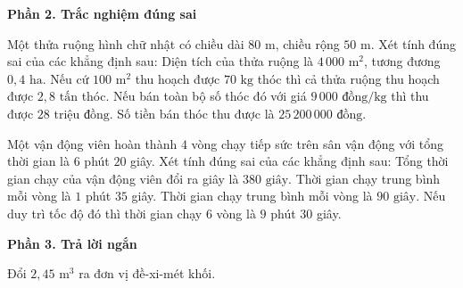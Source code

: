 \textbf{Phần 2. Trắc nghiệm đúng sai}

\begin{ex} %
Một thửa ruộng hình chữ nhật có chiều dài $80\text{ m}$, chiều rộng $50\text{ m}$. Xét tính đúng sai của các khẳng định sau:
\choiceTF
{\True Diện tích của thửa ruộng là $4\,000\text{ m}^2$, tương đương $0{,}4\text{ ha}$.}
{\True Nếu cứ $100\text{ m}^2$ thu hoạch được $70\text{ kg}$ thóc thì cả thửa ruộng thu hoạch được $2{,}8\text{ tấn}$ thóc.}
{Nếu bán toàn bộ số thóc đó với giá $9\,000\text{ đồng/kg}$ thì thu được $28\text{ triệu đồng}$.}
{\True Số tiền bán thóc thu được là $25\,200\,000\text{ đồng}$.}
\end{ex}

\begin{ex} %
Một vận động viên hoàn thành $4$ vòng chạy tiếp sức trên sân vận động với tổng thời gian là $6$ phút $20$ giây. Xét tính đúng sai của các khẳng định sau:
\choiceTF
{\True Tổng thời gian chạy của vận động viên đổi ra giây là $380\text{ giây}$.}
{\True Thời gian chạy trung bình mỗi vòng là $1$ phút $35$ giây.}
{Thời gian chạy trung bình mỗi vòng là $90\text{ giây}$.}
{\True Nếu duy trì tốc độ đó thì thời gian chạy $6$ vòng là $9$ phút $30$ giây.}
\end{ex}

\textbf{Phần 3. Trả lời ngắn}

\begin{ex} %
Đổi $2{,}45\text{ m}^3$ ra đơn vị đề-xi-mét khối.
\end{ex}

